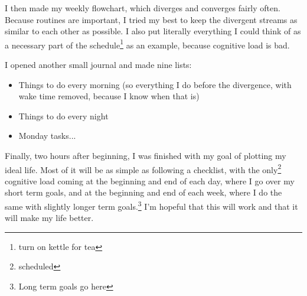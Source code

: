 \documentclass[12pt]{article}[titlepage]
\renewcommand{\,}{\textsuperscript{,}}
\begin{document}
I then made my weekly flowchart, which diverges and converges fairly often.  
Because routines are important, I tried my best to keep the divergent streams as similar to each other as possible.  
I also put literally everything I could think of as a necessary part of the schedule\footnote{turn on kettle for tea} as an example, because cognitive load is bad.

I opened another small journal and made nine lists:  
\begin{itemize}  
\item Things to do every morning (so everything I do before the divergence, with wake time removed, because I know when that is)  
\item Things to do every night  
\item Monday tasks...  
\end{itemize}

Finally, two hours after beginning, I was finished with my goal of plotting my ideal life.  
Most of it will be as simple as following a checklist, with the only\footnote{scheduled} cognitive load coming at the beginning and end of each day, where I go over my short term goals, and at the beginning and end of each week, where I do the same with slightly longer term goals.\footnote{Long term goals go here}  
I'm hopeful that this will work and that it will make my life better.
\end{document}
